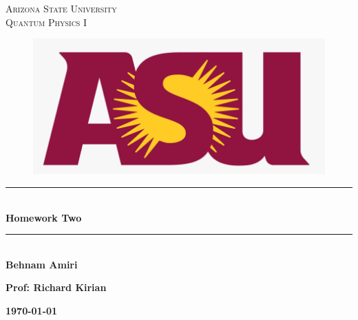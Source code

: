 \documentclass[fleqn]{article}
\begin{document}
  \begin{titlepage}

    \newcommand{\HRule}{\rule{\linewidth}{0.5mm}} %

    \center %



    \textsc{\LARGE Arizona State University}\\[1.5cm] %

    \textsc{\LARGE Quantum Physics I }\\[1.5cm] %


    \begin{figure}
      \includegraphics[width=\linewidth]{asu.png}
    \end{figure}


    \HRule \\[0.4cm]
    { \huge \bfseries Homework Two}\\[0.4cm] 
    \HRule \\[1.5cm]

    \textbf{Behnam Amiri}

    \bigbreak

    \textbf{Prof: Richard Kirian}

    \bigbreak


    \textbf{{\large \today}\\[2cm]}

    \vfill

  \end{titlepage}
\end{document}
